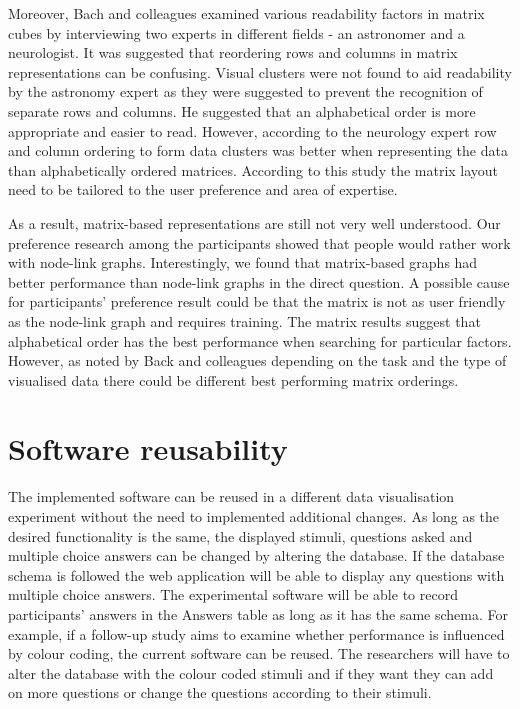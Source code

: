 \documentclass{l4proj}
\begin{document}
Moreover, Bach and colleagues \cite{bach2014visualizing} examined various readability factors in matrix cubes by interviewing two experts in different fields - an astronomer and a neurologist. It was suggested that reordering rows and columns in matrix representations can be confusing. Visual clusters were not found to aid readability by the astronomy expert as they were suggested to prevent the recognition of separate rows and columns. He suggested that an alphabetical order is more appropriate and easier to read. However, according to the neurology expert row and column ordering to form data clusters was better when representing the data than alphabetically ordered matrices. According to this study the matrix layout need to be tailored to the user preference and area of expertise.

As a result, matrix-based representations are still not very well understood. Our preference research among the participants showed that people would rather work with node-link graphs. Interestingly, we found that matrix-based graphs had better performance than node-link graphs in the direct question. A possible cause for participants' preference result could be that the matrix is not as user friendly as the node-link graph and requires training. The matrix results suggest that alphabetical order has the best performance when searching for particular factors. However, as noted by Back and colleagues \cite{bach2014visualizing} depending on the task and the type of visualised data there could be different best performing matrix orderings. 

\section{Software reusability}

The implemented software can be reused in a different data visualisation experiment without the need to implemented additional changes. As long as the desired functionality is the same, the displayed stimuli, questions asked and multiple choice answers can be changed by altering the database. If the database schema is followed the web application will be able to display any questions with multiple choice answers. The experimental software will be able to record participants' answers in the Answers table as long as it has the same schema. For example, if a follow-up study aims to examine whether performance is influenced by colour coding, the current software can be reused. The researchers will have to alter the database with the colour coded stimuli and if they want they can add on more questions or change the questions according to their stimuli. 
\end{document}
